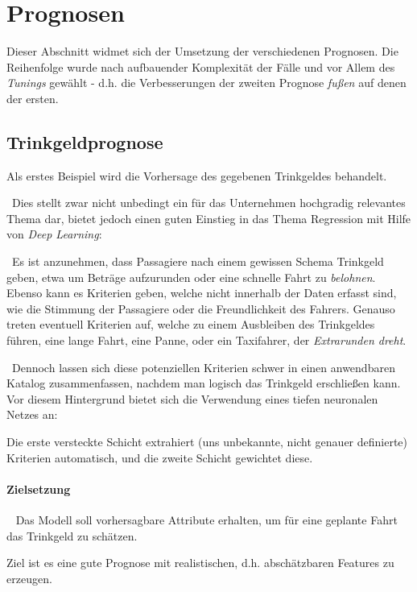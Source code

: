 \newpage
\section{Prognosen}
\label{Prognosen}
Dieser Abschnitt widmet sich der Umsetzung der verschiedenen Prognosen. Die Reihenfolge wurde nach aufbauender Komplexität der Fälle und vor Allem des \textit{Tunings} gewählt - d.h. die Verbesserungen der zweiten Prognose \textit{fußen} auf denen der ersten.
\subsection{Trinkgeldprognose}
\label{sec:TipPred}
Als erstes Beispiel wird die Vorhersage des gegebenen Trinkgeldes behandelt. 

~\newline Dies stellt zwar nicht unbedingt ein für das Unternehmen hochgradig relevantes Thema dar, bietet jedoch einen guten Einstieg in das Thema Regression mit Hilfe von \textit{Deep Learning}:

~\newline Es ist anzunehmen, dass Passagiere nach einem gewissen Schema Trinkgeld geben, etwa um Beträge aufzurunden oder eine schnelle Fahrt zu \textit{belohnen}. Ebenso kann es Kriterien geben, welche nicht innerhalb der Daten erfasst sind, wie die Stimmung der Passagiere oder die Freundlichkeit des Fahrers. Genauso treten eventuell Kriterien auf, welche zu einem Ausbleiben des Trinkgeldes führen, eine lange Fahrt, eine Panne, oder ein Taxifahrer, der \textit{Extrarunden dreht}. 

~\newline Dennoch lassen sich diese potenziellen Kriterien schwer in einen anwendbaren Katalog zusammenfassen, nachdem man logisch das Trinkgeld erschließen kann. Vor diesem Hintergrund bietet sich die Verwendung eines tiefen neuronalen Netzes an: 

Die erste versteckte Schicht extrahiert (uns unbekannte, nicht genauer definierte) Kriterien automatisch, und die zweite Schicht gewichtet diese. 
\paragraph{Zielsetzung} ~\newline
Das Modell soll vorhersagbare Attribute erhalten, um für eine geplante Fahrt das Trinkgeld zu schätzen. 

Ziel ist es eine gute Prognose mit realistischen, d.h. abschätzbaren Features zu erzeugen. 

